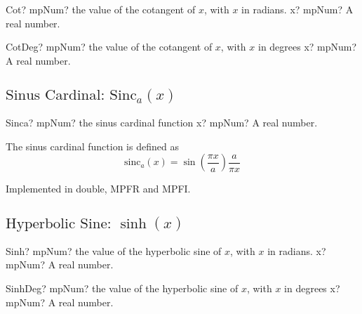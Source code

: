 \begin{mpFunctionsExtract}
	\mpFunctionOne
	{Cot? mpNum? the value of the cotangent of $x$, with $x$ in radians.}
	{x? mpNum? A real number.}
\end{mpFunctionsExtract}

\vspace{0.6cm}

\begin{mpFunctionsExtract}
	\mpFunctionOne
	{CotDeg? mpNum? the value of the cotangent of $x$, with $x$ in degrees}
	{x? mpNum? A real number.}
\end{mpFunctionsExtract}





\subsection{\texorpdfstring{$\text{Sinus Cardinal: Sinc}{}_a(x)$}{Sinca}}

\begin{mpFunctionsExtract}
	\mpFunctionOne
	{Sinca? mpNum? the sinus cardinal function}
	{x? mpNum? A real number.}
\end{mpFunctionsExtract}

\vspace{0.3cm}
The sinus cardinal function is defined as
\begin{equation}
	\text{sinc}_a(x) = \sin \left( \frac{\pi x}{a} \right) \frac{a}{\pi x}
\end{equation}

Implemented in double, MPFR and MPFI.





\subsection{\texorpdfstring{$\text{Hyperbolic Sine: }\sinh(x)$}{sinh}}

\begin{mpFunctionsExtract}
	\mpFunctionOne
	{Sinh? mpNum? the value of the hyperbolic sine of $x$, with $x$ in radians.}
	{x? mpNum? A real number.}
\end{mpFunctionsExtract}

\vspace{0.6cm}

\begin{mpFunctionsExtract}
	\mpFunctionOne
	{SinhDeg? mpNum? the value of the hyperbolic sine of $x$, with $x$ in degrees}
	{x? mpNum? A real number.}
\end{mpFunctionsExtract}




